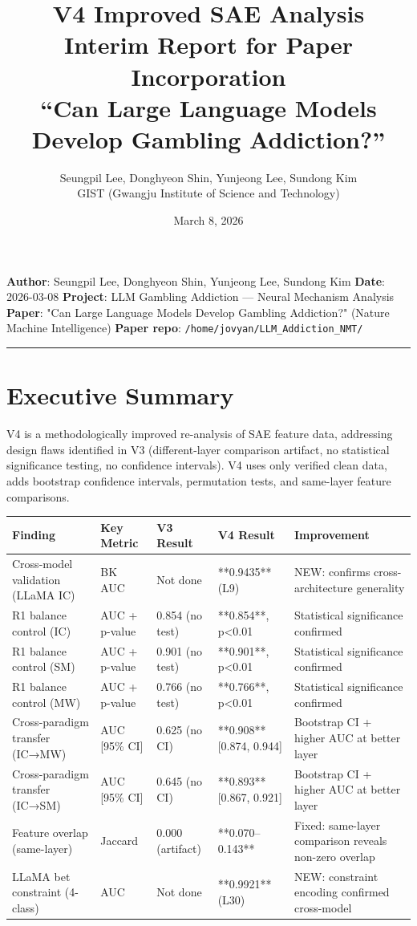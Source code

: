 \documentclass[11pt,a4paper]{article}
\title{\textbf{V4 Improved SAE Analysis}\\[0.5em]
\large Interim Report for Paper Incorporation\\[0.3em]
\normalsize ``Can Large Language Models Develop Gambling Addiction?''}
\author{Seungpil Lee, Donghyeon Shin, Yunjeong Lee, Sundong Kim\\
\small GIST (Gwangju Institute of Science and Technology)}
\date{March 8, 2026}
\begin{document}
\maketitle
\tableofcontents
\newpage


\textbf{Author}: Seungpil Lee, Donghyeon Shin, Yunjeong Lee, Sundong Kim
\textbf{Date}: 2026-03-08
\textbf{Project}: LLM Gambling Addiction — Neural Mechanism Analysis
\textbf{Paper}: "Can Large Language Models Develop Gambling Addiction?" (Nature Machine Intelligence)
\textbf{Paper repo}: \texttt{/home/jovyan/LLM_Addiction_NMT/}

\bigskip\hrule\bigskip

\section{Executive Summary}

V4 is a methodologically improved re-analysis of SAE feature data, addressing design flaws identified in V3 (different-layer comparison artifact, no statistical significance testing, no confidence intervals). V4 uses only verified clean data, adds bootstrap confidence intervals, permutation tests, and same-layer feature comparisons.

\begin{table}[htbp]
\centering
\footnotesize
\begin{tabular}{|l|l|l|l|l|}
\hline
Finding & Key Metric & V3 Result & V4 Result & Improvement \\
\hline
Cross-model validation (LLaMA IC) & BK AUC & Not done & **0.9435** (L9) & NEW: confirms cross-architecture generality \\
R1 balance control (IC) & AUC + p-value & 0.854 (no test) & **0.854**, p<0.01 & Statistical significance confirmed \\
R1 balance control (SM) & AUC + p-value & 0.901 (no test) & **0.901**, p<0.01 & Statistical significance confirmed \\
R1 balance control (MW) & AUC + p-value & 0.766 (no test) & **0.766**, p<0.01 & Statistical significance confirmed \\
Cross-paradigm transfer (IC→MW) & AUC [95\% CI] & 0.625 (no CI) & **0.908** [0.874, 0.944] & Bootstrap CI + higher AUC at better layer \\
Cross-paradigm transfer (IC→SM) & AUC [95\% CI] & 0.645 (no CI) & **0.893** [0.867, 0.921] & Bootstrap CI + higher AUC at better layer \\
Feature overlap (same-layer) & Jaccard & 0.000 (artifact) & **0.070–0.143** & Fixed: same-layer comparison reveals non-zero overlap \\
LLaMA bet constraint (4-class) & AUC & Not done & **0.9921** (L30) & NEW: constraint encoding confirmed cross-model \\
\hline
\end{tabular}
\end{table}
\end{document}
